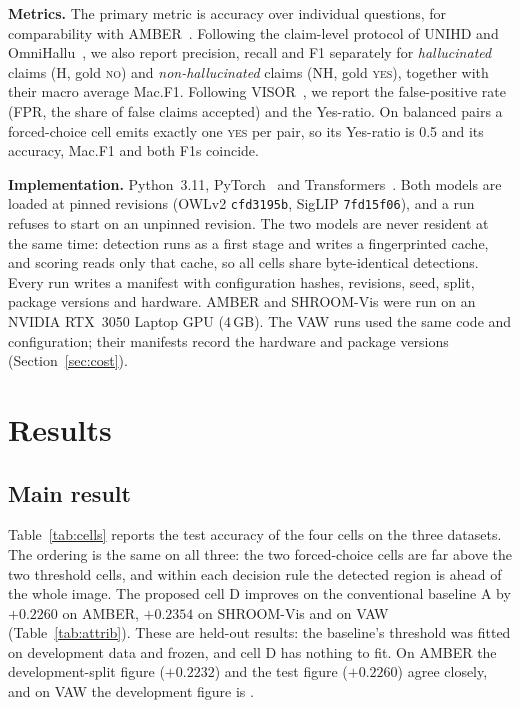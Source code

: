 \documentclass[11pt]{article}
\newcommand{\yes}{\textsc{yes}}
\newcommand{\no}{\textsc{no}}
\begin{document}
\textbf{Metrics.} The primary metric is accuracy over individual questions, for comparability with AMBER~\cite{wang2023amber}. Following the claim-level protocol of UNIHD and OmniHallu~\cite{chen2024unihd,yang2026omnihallu}, we also report precision, recall and F1 separately for \emph{hallucinated} claims (H, gold \no) and \emph{non-hallucinated} claims (NH, gold \yes), together with their macro average Mac.F1. Following VISOR~\cite{zhang2026visor}, we report the false-positive rate (FPR, the share of false claims accepted) and the Yes-ratio. On balanced pairs a forced-choice cell emits exactly one \yes{} per pair, so its Yes-ratio is 0.5 and its accuracy, Mac.F1 and both F1s coincide.

\textbf{Implementation.} Python~3.11, PyTorch~\cite{paszke2019pytorch} and Transformers~\cite{wolf2020transformers}. Both models are loaded at pinned revisions (OWLv2 \texttt{cfd3195b}, SigLIP \texttt{7fd15f06}), and a run refuses to start on an unpinned revision. The two models are never resident at the same time: detection runs as a first stage and writes a fingerprinted cache, and scoring reads only that cache, so all cells share byte-identical detections. Every run writes a manifest with configuration hashes, revisions, seed, split, package versions and hardware. AMBER and SHROOM-Vis were run on an NVIDIA RTX~3050 Laptop GPU (4\,GB). The VAW runs used the same code and configuration; their manifests record the hardware and package versions (Section~\ref{sec:cost}).

\section{Results}\label{sec:results}

\subsection{Main result}\label{sec:mainres}
Table~\ref{tab:cells} reports the test accuracy of the four cells on the three datasets. The ordering is the same on all three: the two forced-choice cells are far above the two threshold cells, and within each decision rule the detected region is ahead of the whole image. The proposed cell D improves on the conventional baseline A by $+0.2260$ on AMBER, $+0.2354$ on SHROOM-Vis and \VAWtestDminusA{} on VAW (Table~\ref{tab:attrib}). These are held-out results: the baseline's threshold was fitted on development data and frozen, and cell D has nothing to fit. On AMBER the development-split figure ($+0.2232$) and the test figure ($+0.2260$) agree closely, and on VAW the development figure is \VAWdevDminusA.
\end{document}
